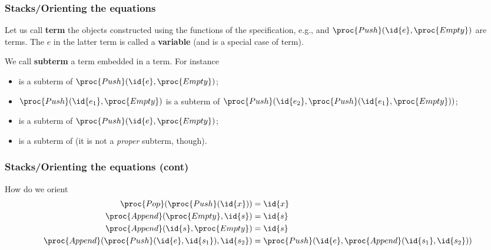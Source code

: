 %
\begin{frame}
\frametitle{Stacks/Orienting the equations}

Let us call \textbf{term} the objects constructed using the functions
of the specification, e.g.,  and \(\proc{Push} (\id{e},
\proc{Empty})\) are terms. The \(e\) in the latter term is called a
\textbf{variable} (and is a special case of term).

\bigskip

We call \textbf{subterm} a term embedded in a term. For instance
\begin{itemize}

  \item {} is a subterm of \(\proc{Push} (\id{e},
  \proc{Empty})\);

  \item \(\proc{Push} (\id{e_1}, \proc{Empty})\) is a subterm of
  \(\proc{Push} (\id{e_2}, \proc{Push} (\id{e_1}, \proc{Empty}))\);

  \item {} is a subterm of \(\proc{Push} (\id{e},
  \proc{Empty})\);

  \item {} is a subterm of  (it is not a \emph{proper}
  subterm, though).

\end{itemize}

\end{frame}

%
\begin{frame}
\frametitle{Stacks/Orienting the equations (cont)}

How do we orient
\begin{align*}
   \proc{Pop} (\proc{Push} (\id{x}))
&= \id{x}\\
   \proc{Append} (\proc{Empty}, \id{s}) 
&= \id{s}\\
   \proc{Append} (\id{s}, \proc{Empty}) 
&= \id{s}\\
   \proc{Append} (\proc{Push} (\id{e}, \id{s_1}), \id{s_2}) 
&= \proc{Push} (\id{e}, \proc{Append} (\id{s_1}, \id{s_2}))
\end{align*}

\end{frame}

